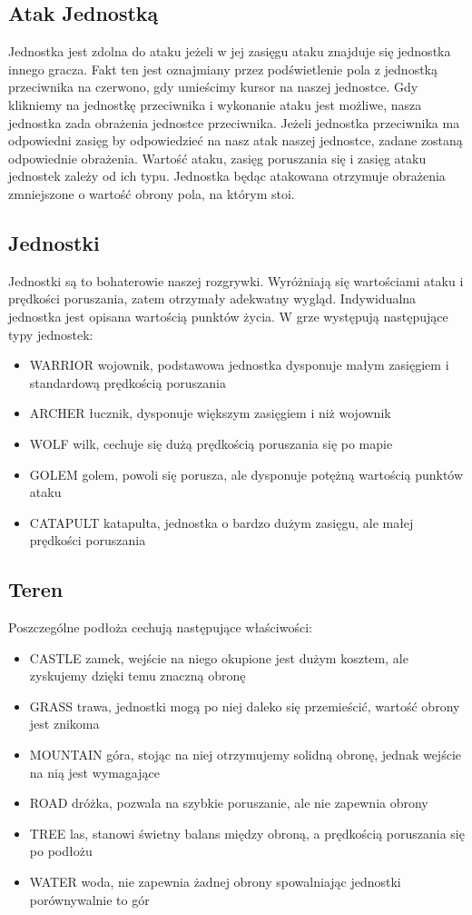 \documentclass[paper=a4, fontsize=11pt]{scrartcl} %
\numberwithin{equation}{section} %
\numberwithin{figure}{section} %
\numberwithin{table}{section} %
\begin{document}
\subsection{Atak Jednostką}
Jednostka jest zdolna do ataku jeżeli w jej zasięgu ataku znajduje się jednostka innego gracza. Fakt ten jest oznajmiany przez podświetlenie pola z jednostką przeciwnika na czerwono, gdy umieścimy kursor na naszej jednostce. Gdy klikniemy na jednostkę przeciwnika i wykonanie ataku jest możliwe, nasza jednostka zada obrażenia jednostce przeciwnika. Jeżeli jednostka przeciwnika ma odpowiedni zasięg by odpowiedzieć na nasz atak naszej jednostce, zadane zostaną odpowiednie obrażenia. Wartość ataku, zasięg poruszania się i zasięg ataku jednostek zależy od ich typu. Jednostka będąc atakowana otrzymuje obrażenia zmniejszone o wartość obrony pola, na którym stoi.
\subsection{Jednostki}
Jednostki są to bohaterowie naszej rozgrywki. Wyróżniają się wartościami ataku i prędkości poruszania, zatem otrzymały adekwatny wygląd. Indywidualna jednostka jest opisana wartością punktów życia. W grze występują następujące typy jednostek:
\begin{itemize}
\item{WARRIOR} wojownik, podstawowa jednostka dysponuje małym zasięgiem i standardową prędkością poruszania
\item{ARCHER} łucznik, dysponuje większym zasięgiem i niż wojownik
\item{WOLF} wilk, cechuje się dużą prędkością poruszania się po mapie
\item{GOLEM} golem, powoli się porusza, ale dysponuje potężną wartością punktów ataku
\item{CATAPULT} katapulta, jednostka o bardzo dużym zasięgu, ale małej prędkości poruszania
\end{itemize}

\subsection{Teren}
Poszczególne podłoża cechują następujące właściwości:
\begin{itemize}
\item{CASTLE} zamek, wejście na niego okupione jest dużym kosztem, ale zyskujemy dzięki temu znaczną obronę
\item{GRASS} trawa, jednostki mogą po niej daleko się przemieścić, wartość obrony jest znikoma
\item{MOUNTAIN} góra, stojąc na niej otrzymujemy solidną obronę, jednak wejście na nią jest wymagające
\item{ROAD} dróżka, pozwala na szybkie poruszanie, ale nie zapewnia obrony
\item{TREE} las, stanowi świetny balans między obroną, a prędkością poruszania się po podłożu
\item{WATER} woda, nie zapewnia żadnej obrony spowalniając jednostki porównywalnie to gór
\end{itemize}
\end{document}

